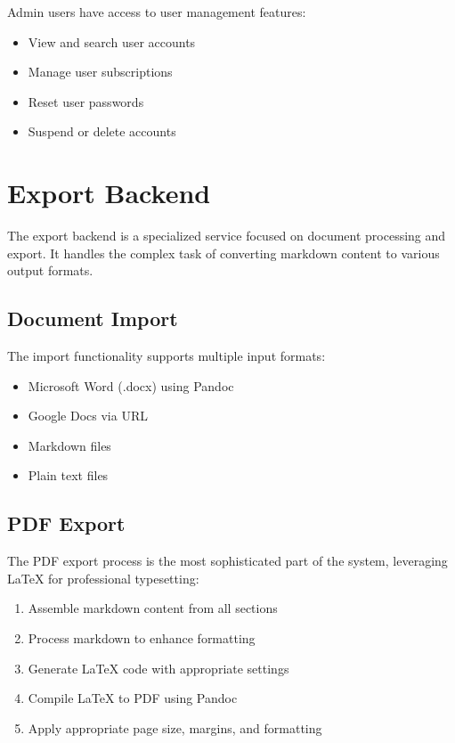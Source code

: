 \documentclass[12pt,a4paper]{book}
\begin{document}
Admin users have access to user management features:

\begin{itemize}
  \item View and search user accounts
  \item Manage user subscriptions
  \item Reset user passwords
  \item Suspend or delete accounts
\end{itemize}

\section{Export Backend}

The export backend is a specialized service focused on document processing and export. It handles the complex task of converting markdown content to various output formats.

\subsection{Document Import}

The import functionality supports multiple input formats:

\begin{itemize}
  \item Microsoft Word (.docx) using Pandoc
  \item Google Docs via URL
  \item Markdown files
  \item Plain text files
\end{itemize}

\subsection{PDF Export}

The PDF export process is the most sophisticated part of the system, leveraging LaTeX for professional typesetting:

\begin{enumerate}
  \item Assemble markdown content from all sections
  \item Process markdown to enhance formatting
  \item Generate LaTeX code with appropriate settings
  \item Compile LaTeX to PDF using Pandoc
  \item Apply appropriate page size, margins, and formatting
\end{enumerate}
\end{document}
